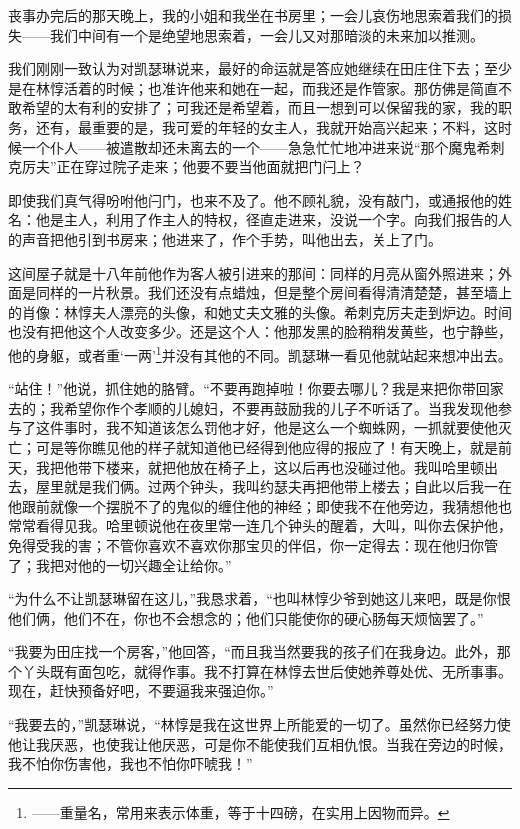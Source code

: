 \par 丧事办完后的那天晚上，我的小姐和我坐在书房里；一会儿哀伤地思索着我们的损失——我们中间有一个是绝望地思索着，一会儿又对那暗淡的未来加以推测。
\par 我们刚刚一致认为对凯瑟琳说来，最好的命运就是答应她继续在田庄住下去；至少是在林惇活着的时候；也准许他来和她在一起，而我还是作管家。那仿佛是简直不敢希望的太有利的安排了；可我还是希望着，而且一想到可以保留我的家，我的职务，还有，最重要的是，我可爱的年轻的女主人，我就开始高兴起来；不料，这时候一个仆人——被遣散却还未离去的一个——急急忙忙地冲进来说“那个魔鬼希刺克厉夫”正在穿过院子走来；他要不要当他面就把门闩上？
\par 即使我们真气得吩咐他闩门，也来不及了。他不顾礼貌，没有敲门，或通报他的姓名：他是主人，利用了作主人的特权，径直走进来，没说一个字。向我们报告的人的声音把他引到书房来；他进来了，作个手势，叫他出去，关上了门。
\par 这间屋子就是十八年前他作为客人被引进来的那间：同样的月亮从窗外照进来；外面是同样的一片秋景。我们还没有点蜡烛，但是整个房间看得清清楚楚，甚至墙上的肖像：林惇夫人漂亮的头像，和她丈夫文雅的头像。希刺克厉夫走到炉边。时间也没有把他这个人改变多少。还是这个人：他那发黑的脸稍稍发黄些，也宁静些，他的身躯，或者重‘一两’\footnote{——重量名，常用来表示体重，等于十四磅，在实用上因物而异。}并没有其他的不同。凯瑟琳一看见他就站起来想冲出去。
\par “站住！”他说，抓住她的胳臂。“不要再跑掉啦！你要去哪儿？我是来把你带回家去的；我希望你作个孝顺的儿媳妇，不要再鼓励我的儿子不听话了。当我发现他参与了这件事时，我不知道该怎么罚他才好，他是这么一个蜘蛛网，一抓就要使他灭亡；可是等你瞧见他的样子就知道他已经得到他应得的报应了！有天晚上，就是前天，我把他带下楼来，就把他放在椅子上，这以后再也没碰过他。我叫哈里顿出去，屋里就是我们俩。过两个钟头，我叫约瑟夫再把他带上楼去；自此以后我一在他跟前就像一个摆脱不了的鬼似的缠住他的神经；即使我不在他旁边，我猜想他也常常看得见我。哈里顿说他在夜里常一连几个钟头的醒着，大叫，叫你去保护他，免得受我的害；不管你喜欢不喜欢你那宝贝的伴侣，你一定得去：现在他归你管了；我把对他的一切兴趣全让给你。”
\par “为什么不让凯瑟琳留在这儿，”我恳求着，“也叫林惇少爷到她这儿来吧，既是你恨他们俩，他们不在，你也不会想念的；他们只能使你的硬心肠每天烦恼罢了。”
\par “我要为田庄找一个房客，”他回答，“而且我当然要我的孩子们在我身边。此外，那个丫头既有面包吃，就得作事。我不打算在林惇去世后使她养尊处优、无所事事。现在，赶快预备好吧，不要逼我来强迫你。”
\par “我要去的，”凯瑟琳说，“林惇是我在这世界上所能爱的一切了。虽然你已经努力使他让我厌恶，也使我让他厌恶，可是你不能使我们互相仇恨。当我在旁边的时候，我不怕你伤害他，我也不怕你吓唬我！”
